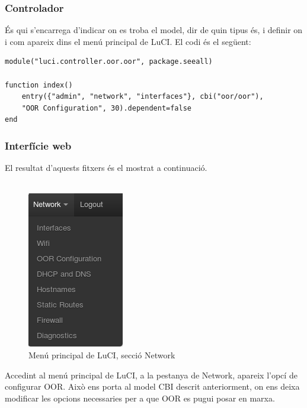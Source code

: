 \documentclass[11pt]{article}
\begin{document}
\subsubsection{Controlador}
És qui s’encarrega d’indicar on es troba el model, dir de quin tipus és, i definir on i com apareix dins el menú principal de LuCI. El codi és el següent:\\
\lstset{caption=Controlador de la interfície LuCI}
\begin{lstlisting}[frame=single]
module("luci.controller.oor.oor", package.seeall)

function index()
    entry({"admin", "network", "interfaces"}, cbi("oor/oor"),
	"OOR Configuration", 30).dependent=false
end
\end{lstlisting}
\newpage
\subsubsection{Interfície web}
El resultat d’aquests fitxers és el mostrat a continuació. \\
\\
	\begin{figure}[h]
		\centering
		\includegraphics[scale=0.75]{luci1}
		\caption{Menú principal de LuCI, secció Network}
	\end{figure}	
	
Accedint al menú principal de LuCI, a la pestanya de Network, apareix l’opcí de configurar OOR. Això ens porta al model CBI descrit anteriorment, on ens deixa modificar les opcions necessaries per a que OOR es pugui posar en marxa.\\
\end{document}
